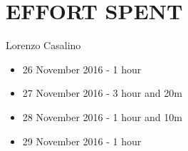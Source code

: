 \section{EFFORT SPENT}

	Lorenzo Casalino

	\begin{itemize}
		\item 26 November 2016 - 1 hour
		\item 27 November 2016 - 3 hour and 20m
		\item 28 November 2016 - 1 hour and 10m
		\item 29 November 2016 - 1 hour
	\end{itemize}

